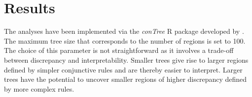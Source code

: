 \documentclass[fleqn,10pt]{wlscirep}
\begin{document}
\section*{Results}

The analyses have been implemented via the \textit{conTree} R package developed by \cite{FriedmanNarasimhan2020}.
The maximum tree size that corresponds to the number of regions is set to 100. The choice of this parameter is not straightforward as it involves a trade-off between discrepancy and interpretability.
Smaller trees give rise to larger regions defined by simpler conjunctive rules and are thereby easier to interpret. Larger trees have the potential to uncover smaller regions of higher discrepancy defined by more complex rules.
\end{document}
